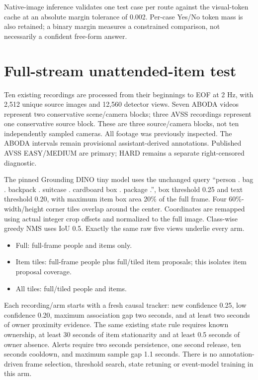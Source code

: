 \documentclass[10pt,a4paper]{article}
\begin{document}
Native-image inference validates one test case per route against the visual-token cache at an absolute margin tolerance of 0.002. Per-case Yes/No token mass is also retained; a binary margin measures a constrained comparison, not necessarily a confident free-form answer.

\section{Full-stream unattended-item test}

Ten existing recordings are processed from their beginnings to EOF at 2 Hz, with 2,512 unique source images and 12,560 detector views. Seven ABODA videos represent two conservative scene/camera blocks; three AVSS recordings represent one conservative source block. These are three source/camera blocks, not ten independently sampled cameras. All footage was previously inspected. The ABODA intervals remain provisional assistant-derived annotations. Published AVSS EASY/MEDIUM are primary; HARD remains a separate right-censored diagnostic.

The pinned Grounding DINO tiny model uses the unchanged query ``person . bag . backpack . suitcase . cardboard box . package .'', box threshold 0.25 and text threshold 0.20, with maximum item box area 20\% of the full frame. Four 60\%-width/height corner tiles overlap around the center. Coordinates are remapped using actual integer crop offsets and normalized to the full image. Class-wise greedy NMS uses IoU 0.5. Exactly the same raw five views underlie every arm.

\begin{itemize}
\item Full: full-frame people and items only.
\item Item tiles: full-frame people plus full/tiled item proposals; this isolates item proposal coverage.
\item All tiles: full/tiled people and items.
\end{itemize}
Each recording/arm starts with a fresh causal tracker: new confidence 0.25, low confidence 0.20, maximum association gap two seconds, and at least two seconds of owner proximity evidence. The same existing state rule requires known ownership, at least 30 seconds of item stationarity and at least 0.5 seconds of owner absence. Alerts require two seconds persistence, one second release, ten seconds cooldown, and maximum sample gap 1.1 seconds. There is no annotation-driven frame selection, threshold search, state retuning or event-model training in this arm.
\end{document}

